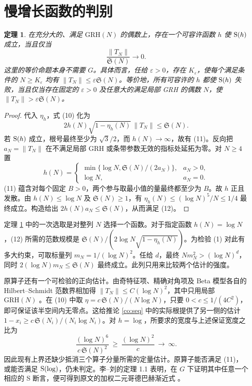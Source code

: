 \documentclass[UTF8,a4paper,11pt,fontset=fandol]{ctexart}
\newtheorem{theorem}{定理}
\newcommand{\Sg}{\mathfrak S}
\newcommand{\GRH}{\mathrm{GRH}}
\begin{document}
\section{慢增长函数的判别}
\begin{theorem}\label{th:slow}
在充分大的、满足 \(\GRH(N)\) 的偶数上，存在一个可容许函数 \(h\) 使 \({\rm S}(h)\) 成立，当且仅当
\[
                 \frac{\|T_N\|}{\Sg(N)}\longrightarrow 0.    \tag{11}
\]
这里的等价命题本身不需要 \(G\)。具体而言，任给 \(\varepsilon>0\)，存在 \(K_\varepsilon\)，使每个满足条件的 \(N\ge K_\varepsilon\) 均有 \(\|T_N\|\le\varepsilon\Sg(N)\)。等价地，所有可容许的 \(h\) 都使 \({\rm S}(h)\) 失败，当且仅当存在固定的 \(\varepsilon>0\) 及任意大的满足局部 GRH 的偶数 \(N\)，使 \(\|T_N\|>\varepsilon\Sg(N)\)。
\end{theorem}
\begin{proof}
代入 \(\eta_h\)，式 (10) 化为
\[
         2h(N)\sqrt{1-\eta_h(N)}\,\|T_N\|\le\Sg(N).          \tag{12}
\]
若 \({\rm S}(h)\) 成立，根号最终至少为 \(\sqrt{3}/2\)，而 \(h(N)\to\infty\)，故有 (11)。反向把 \(a_N=\|T_N\|\) 在不满足局部 GRH 或条带参数无效的指标处延拓为零。对 \(N\ge4\) 置
\[
 h(N)=
 \begin{cases}
 \min\{\log N,\Sg(N)/(2a_N)\},& a_N>0,\\
 \log N,&a_N=0.
 \end{cases}
\]
(11) 蕴含对每个固定 \(B>0\)，两个参与取最小值的量最终都至少为 \(B\)。故 \(h\) 正且发散。由 \(h(N)\le\log N\) 及 \(\Sg(N)\ge1\)，有 \(\eta_h(N)\le(\log N)^5/N\le1/4\) 最终成立。构造给出 \(2h(N)a_N\le\Sg(N)\)，从而满足 (12)。
\end{proof}

定理 \ref{th:slow} 中的一次选取是对整列 \(N\) 选择一个函数。对于指定函数 \(h(N)=\log N\)，(12) 所需的范数规模是 \(\Sg(N)/(2\log N\sqrt{1-\eta_h(N)})\)。为检验 (1) 对此有多大约束，可取标量列 \(m_N=1/(\log N)^2\)。任给 \(d\)，最终 \(Nm_N^2>(\log N)^d\)，同时 \(2(\log N)m_N\le\Sg(N)\) 最终成立。此列只用来比较两个估计的强度。

原算子还有一个可检验的正向估计。由奇特征项、精确对角项及 Beta 模型各自的 Hilbert--Schmidt 范数界相加得 \(\|T_N\|\le C(\log N)^2\)，其中只用局部 \(\GRH(N)\) \cite[定理~6.2]{LL}。在 (10) 中取 \(\eta=c\,\Sg(N)/(N\log N)\)，只要 \(0<c\le1/(4C^2)\)，即可保证该半空间内无零点。这给推论 \ref{co:seq} 中的实际根提供了另一侧的估计 \(1-x_i\ge c\,\Sg(N_i)/(N_i\log N_i)\)。对 \(h=\log\)，所要求的宽度与上述保证宽度之比为
\[
       \frac{(\log N)^6}{c\,\Sg(N)^2}\ \ge\ \frac{(\log N)^2}{c}
       \ \longrightarrow\ \infty .
\]
因此现有上界还缺少抵消三个算子分量所需的定量估计。原算子能否满足 (11)，或能否满足 \({\rm S}(\log)\)，仍未判定。李--刘的定理 1.1 表明，在 \(G\) 下证明其中任意一个相应的 S 断言，便可得到原文的加权二元哥德巴赫渐近式 \cite{LL}。
\end{document}
